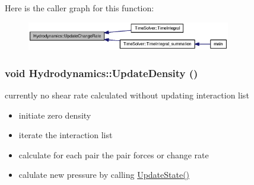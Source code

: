 Here is the caller graph for this function:\nopagebreak
\begin{figure}[H]
\begin{center}
\leavevmode
\includegraphics[width=252pt]{classHydrodynamics_22df8569d81c4c363029efac143ddb26_icgraph}
\end{center}
\end{figure}
\hypertarget{classHydrodynamics_b6cab35a4d7adf70657ef16b9ec4dafd}{
\subsubsection[{UpdateDensity}]{\setlength{\rightskip}{0pt plus 5cm}void Hydrodynamics::UpdateDensity ()}}
\label{classHydrodynamics_b6cab35a4d7adf70657ef16b9ec4dafd}


currently no shear rate calculated without updating interaction list 



\begin{itemize}
\item initiate zero density\end{itemize}


\begin{itemize}
\item iterate the interaction list\end{itemize}


\begin{itemize}
\item calculate for each pair the pair forces or change rate\end{itemize}


\begin{itemize}
\item calulate new pressure by calling \hyperlink{classHydrodynamics_1698dbe8ecc0e730319de5d7eca7a891}{UpdateState()} \end{itemize}


